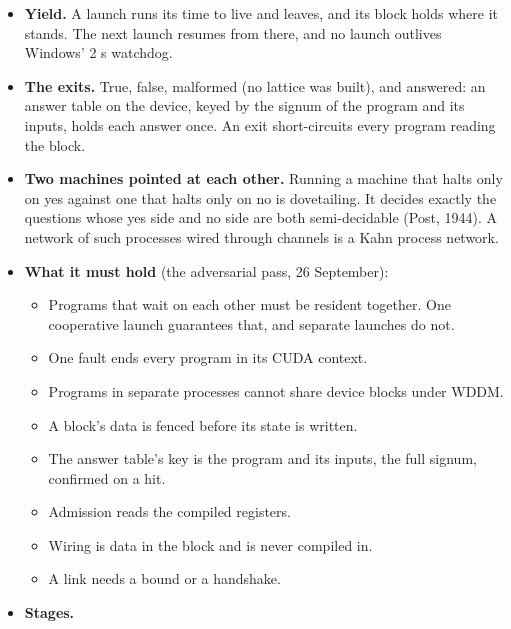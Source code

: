 \begin{enumerate}
\begin{itemize}
\begin{itemize}
\item the program's signum, the run's generation, and the launch that owns it;
\item the scheduler's command (run, yield, stop) and the grant: registers a thread, threads, and device bytes;
\item the state, the exits, and the error's module and site;
\item the check-ins, and the progress: lanes and refusals;
\item the wiring: the blocks it reads and the blocks that read it, each link's words produced and consumed, the result, and the parent;
\item a CRC-64 that seals the block whenever no launch holds it.
\end{itemize}
\item \textbf{Yield.} A launch runs its time to live and leaves, and its block holds where it stands. The next launch resumes from there, and no launch outlives Windows' 2 s watchdog.
\item \textbf{The exits.} True, false, malformed (no lattice was built), and answered: an answer table on the device, keyed by the signum of the program and its inputs, holds each answer once. An exit short-circuits every program reading the block.
\item \textbf{Two machines pointed at each other.} Running a machine that halts only on yes against one that halts only on no is dovetailing. It decides exactly the questions whose yes side and no side are both semi-decidable (Post, 1944). A network of such processes wired through channels is a Kahn process network.
\item \textbf{What it must hold} (the adversarial pass, 26 September):

\begin{itemize}
\item Programs that wait on each other must be resident together. One cooperative launch guarantees that, and separate launches do not.
\item One fault ends every program in its CUDA context.
\item Programs in separate processes cannot share device blocks under WDDM.
\item A block's data is fenced before its state is written.
\item The answer table's key is the program and its inputs, the full signum, confirmed on a hit.
\item Admission reads the compiled registers.
\item Wiring is data in the block and is never compiled in.
\item A link needs a bound or a handshake.
\end{itemize}
\item \textbf{Stages.}


\end{itemize}
\end{enumerate}
